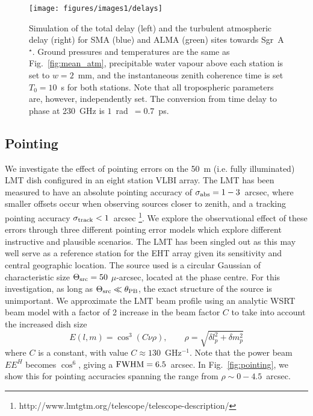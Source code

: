 \begin{figure}
\begin{center}
\texttt{[image: figures/images1/delays]}
\caption{Simulation of the total delay (left) and the turbulent atmospheric delay (right) for SMA (blue) and ALMA (green) sites towards Sgr~A$^\star$. Ground pressures and temperatures are the same as Fig.~\ref{fig:mean_atm}, precipitable water vapour above each station is set to $w=2$~mm, and the instantaneous zenith coherence time is set $T_0=10$~s for both stations. Note that all tropospheric parameters are, however, independently set. The conversion from time delay to phase at 230~GHz is $1$~rad~$=0.7$~ps.\label{delay_plots}%
}
\end{center}
\end{figure}


\subsection{Pointing}
We investigate the effect of pointing errors on the 50~m (i.e. fully illuminated) LMT dish configured in an eight station VLBI array. The LMT has been measured to have an absolute pointing accuracy of $\sigma_{\rm abs} = 1-3$~arcsec, where smaller offsets occur when observing sources closer to zenith, and a tracking pointing accuracy $\sigma_{\rm track} < 1$~arcsec \footnote{http://www.lmtgtm.org/telescope/telescope-description/}. We explore the observational effect of these errors through three different pointing error models which explore different instructive and plausible scenarios. The LMT has been singled out as this may well serve as a reference station for the EHT array given its sensitivity and central geographic location. The source used is a circular Gaussian of characteristic size $\Theta_{\rm src}=50$ $\mu$-arcsec, located at the phase centre. For this investigation, as long as $\Theta_{\rm src} \ll \theta_{\rm PB}$, the exact structure of the source is unimportant. We approximate the LMT beam profile using an analytic WSRT beam model \citep{Popping_2008} with a factor of 2 increase in the beam factor $C$ to take into account the increased dish size
\begin{equation}
E(l, m) = \cos^3(C\nu \rho),\qquad   \rho = \sqrt{\delta l_p^2 + \delta m_p^2}
\end{equation}
where $C$ is a constant, with value $C \approx 130$~GHz$^{-1}$. Note that the power beam $EE^H$ becomes $\cos^6$, giving a $\rm{FWHM} = 6.5 $~arcsec. In Fig.~\ref{fig:pointing}, we show this for pointing accuracies spanning the range from $\rho \sim 0-4.5$~arcsec. 

